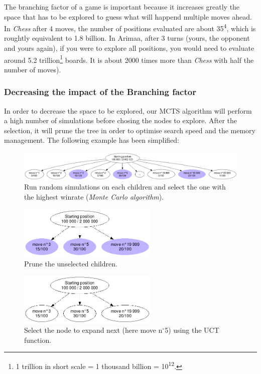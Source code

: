 The branching factor of a game is important because it increases greatly the space that has to be explored to guess what will happend multiple moves ahead. In \textit{Chess} after 4 moves, the number of positions evaluated are about 35\textsuperscript{4}, which is roughtly equivalent to 1.8 billion. In Arimaa, after 3 turns (yours, the opponent and yours again), if you were to explore all positions, you would need to evaluate around 5.2 trillion\footnote{1 trillion in short scale = 1 thousand billion = 10\textsuperscript{12}.} boards. It is about 2000 times more than \textit{Chess} with half the number of moves).

\subsubsection{Decreasing the impact of the Branching factor}

In order to decrease the space to be explored, our MCTS algorithm will perform a high number of simulations before chosing the nodes to explore. After the selection, it will prune the tree in order to optimise search speed and the memory management. The following example has been simplified:
\begin{figure}[H]
\centering
	\includegraphics[width=\textwidth]{3Methods/3.2MCTS/img/root.png}
	\caption{\label{fig:roottree}Run random simulations on each children and select the one with the highest winrate (\textit{Monte Carlo algorithm}).}
\end{figure}

\begin{figure}[H]
\centering
	\includegraphics[height=2.5cm]{3Methods/3.2MCTS/img/prune.png}
	\caption{\label{fig:prune}Prune the unselected children.}
\end{figure}

\begin{figure}[H]
\centering
	\includegraphics[height=2.5cm]{3Methods/3.2MCTS/img/prune-clean.png}
	\caption{\label{fig:prune-clean}Select the node to expand next (here move n$^{\circ}$5) using the UCT function.}
\end{figure}

